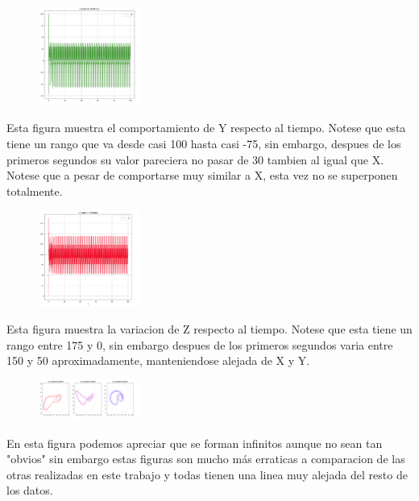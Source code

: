 \documentclass[a4paper]{article}
\begin{document}
\begin{figure}[ht!]
\centering
\includegraphics[width=0.3\textwidth]{D3.png}
\caption{\label{fig:}}
\end{figure}

Esta figura muestra el comportamiento de Y respecto al tiempo. Notese que esta tiene un rango que va desde casi 100 hasta casi -75, sin embargo, despues de los primeros segundos su valor pareciera no pasar de 30 tambien al igual que X. Notese que a pesar de comportarse muy similar a X, esta vez no se superponen totalmente. 
\newpage

\begin{figure}[ht!]
\centering
\includegraphics[width=0.3\textwidth]{E3.png}
\caption{\label{fig:}}
\end{figure}


Esta figura muestra la variacion de Z respecto al tiempo. Notese que esta tiene un rango entre 175 y 0, sin embargo despues de los primeros segundos varia entre 150 y 50 aproximadamente, manteniendose alejada de X y Y. 

\begin{figure}[ht!]
\centering
\includegraphics[width=0.3\textwidth]{F3.png}
\caption{\label{fig:}}
\end{figure}

En esta figura podemos apreciar que se forman infinitos aunque no sean tan "obvios" sin  embargo estas figuras son mucho más erraticas a comparacion de las otras realizadas en este trabajo y todas tienen una linea muy alejada del resto de los datos. 
\end{document}
